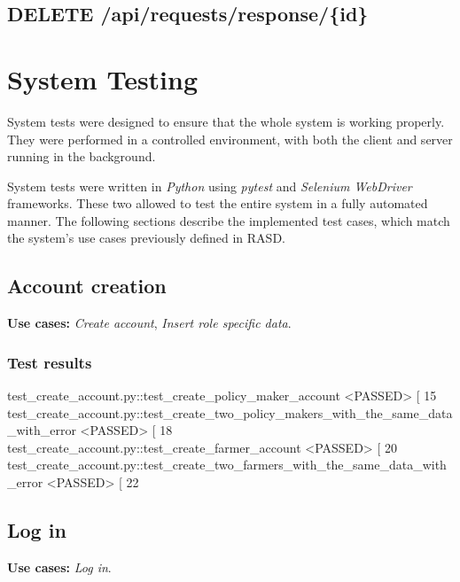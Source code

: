 \subsection{DELETE \slash api\slash requests\slash response\slash\{id\}}


\section{System Testing}

System tests were designed to ensure that the whole system is working properly. They were performed in a controlled environment, with both the client and server running in the background.

System tests were written in \textit{Python} using \textit{pytest} and \textit{Selenium WebDriver} frameworks. These two allowed to test the entire system in a fully automated manner. The following sections describe the implemented test cases, which match the system's use cases previously defined in RASD.



\subsection{Account creation}

\textbf{Use cases:} \textit{Create account}, \textit{Insert role specific data}.

\subsubsection*{Test results}
\begin{verbnobox}[\scriptsize \vbdelim]
test_create_account.py::test_create_policy_maker_account <PASSED>                            [ 15%
test_create_account.py::test_create_two_policy_makers_with_the_same_data_with_error <PASSED> [ 18%
test_create_account.py::test_create_farmer_account <PASSED>                                  [ 20%
test_create_account.py::test_create_two_farmers_with_the_same_data_with_error <PASSED>       [ 22%
\end{verbnobox}

\subsection{Log in}

\textbf{Use cases:} \textit{Log in}.

